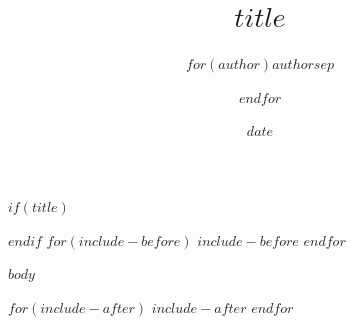 \documentclass[11pt]{article}
\title{$title$}
\author{$for(author)$$author$$sep$ \and $endfor$}
\date{$date$}
\begin{document}
$if(title)$
\maketitle
$endif$
\thispagestyle{fancy}
$for(include-before)$
$include-before$
$endfor$

$body$

$for(include-after)$
$include-after$
$endfor$
\end{document}
